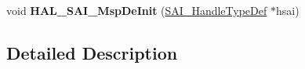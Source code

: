 \begin{DoxyCompactItemize}
\item 
void {\bfseries H\+A\+L\+\_\+\+S\+A\+I\+\_\+\+Msp\+De\+Init} (\hyperlink{group___s_a_i___exported___types_gaf45214e5c90f73800130b3945bf45144}{S\+A\+I\+\_\+\+Handle\+Type\+Def} $\ast$hsai)\hypertarget{group___s_a_i___exported___functions___group1_ga8327b1392a5000f552a9b8d35a0ae6ca}{}\label{group___s_a_i___exported___functions___group1_ga8327b1392a5000f552a9b8d35a0ae6ca}

\end{DoxyCompactItemize}


\subsection{Detailed Description}
